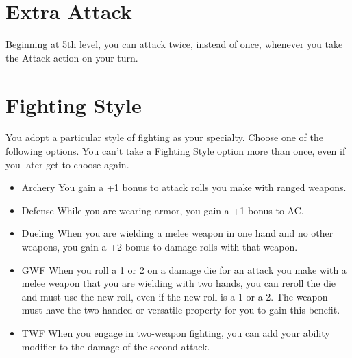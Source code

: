 \begin{multicols*}{2}
   
\section*{Extra Attack} 

Beginning at 5th level, you can attack twice, instead of once, whenever you take the Attack action on your turn.


\section*{Fighting Style}

You adopt a particular style of fighting as your specialty. Choose one of the following options. You can’t take a Fighting Style option more than once, even if you later get to choose again.


\begin{itemize}
    \item Archery You gain a +1 bonus to attack rolls you make with ranged weapons.
    \item Defense While you are wearing armor, you gain a +1 bonus to AC. 
    \item Dueling When you are wielding a melee weapon in one hand and no other weapons, you gain a +2 bonus to damage rolls with that weapon.
    \item GWF When you roll a 1 or 2 on a damage die for an attack you make with a melee weapon that you are wielding with two hands, you can reroll the die and must use the new roll, even if the new roll is a 1 or a 2. The weapon must have the two-handed or versatile property for you to gain this benefit. 
    \item TWF When you engage in two-weapon fighting, you can add your ability modifier to the damage of the second attack.
\end{itemize}



\end{multicols*}

